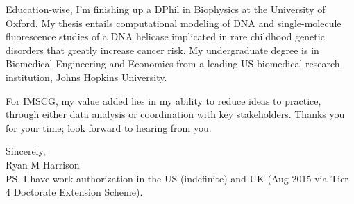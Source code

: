 \documentclass{../res}
\begin{document}
\begin{sloppypar}
\begin{resume}
Education-wise, I'm finishing up a DPhil in Biophysics at the University of Oxford. My thesis entails computational modeling of DNA and single-molecule fluorescence studies of a DNA helicase implicated in rare childhood genetic disorders that greatly increase cancer risk. My undergraduate degree is in Biomedical Engineering and Economics from a leading US biomedical research institution, Johns Hopkins University.

For IMSCG, my value added lies in my ability to reduce ideas to practice, through either data analysis or coordination with key stakeholders. Thanks you for your time; look forward to hearing from you.


\vspace{1\baselineskip}
Sincerely, \\
Ryan M Harrison \\

PS. I have work authorization in the US (indefinite) and UK (Aug-2015 via Tier 4 Doctorate Extension Scheme). 


\end{resume} 
\end{sloppypar}
\end{document}
